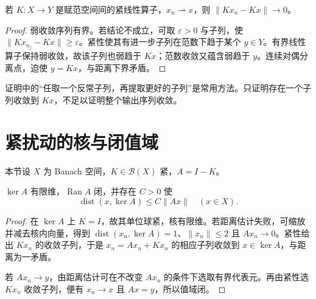\begin{proposition}[紧算子把弱收敛变为范数收敛]\label{prop:fa-compact-weak-strong}
若 $K:X\to Y$ 是赋范空间间的紧线性算子，$x_n\rightharpoonup x$，则 $\|Kx_n-Kx\|\to0$。
\end{proposition}
\begin{proof}
弱收敛序列有界。若结论不成立，可取 $\varepsilon>0$ 与子列，使 $\|Kx_{n_j}-Kx\|\geq\varepsilon$。紧性使其有进一步子列在范数下趋于某个 $y\in Y$。有界线性算子保持弱收敛，故该子列也弱趋于 $Kx$；范数收敛又蕴含弱趋于 $y$。连续对偶分离点，迫使 $y=Kx$，与距离下界矛盾。
\end{proof}
证明中的“任取一个反常子列，再提取更好的子列”是常用方法。只证明存在一个子列收敛到 $Kx$，不足以证明整个输出序列收敛。

\section{紧扰动的核与闭值域}
本节设 $X$ 为 Banach 空间，$K\in\mathcal B(X)$ 紧，$A=I-K$。
\begin{lemma}\label{lem:fa-compact-range}
$\ker A$ 有限维，$\operatorname{Ran}A$ 闭，并存在 $C>0$ 使
\[
 \operatorname{dist}(x,\ker A)\leq C\|Ax\|\quad(x\in X).
\]
\end{lemma}
\begin{proof}
在 $\ker A$ 上 $K=I$，故其单位球紧，核有限维。若距离估计失败，可缩放并减去核内向量，得到 $\operatorname{dist}(x_n,\ker A)=1$、$\|x_n\|\leq2$ 且 $Ax_n\to0$。紧性给出 $Kx_n$ 的收敛子列，于是 $x_n=Ax_n+Kx_n$ 的相应子列收敛到 $x\in\ker A$，与距离为一矛盾。

若 $Ax_n\to y$，由距离估计可在不改变 $Ax_n$ 的条件下选取有界代表元。再由紧性选 $Kx_n$ 收敛子列，便有 $x_n\to x$ 且 $Ax=y$，所以值域闭。
\end{proof}

